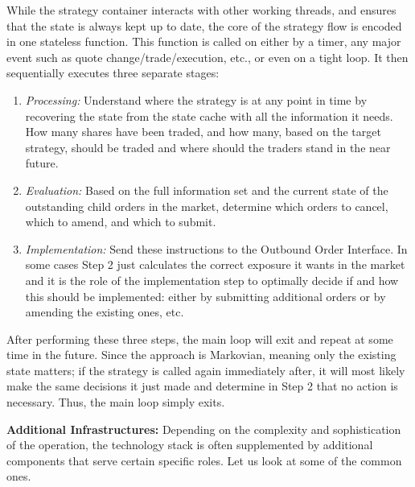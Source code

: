 While the strategy container interacts with other working threads, and ensures that the state is always kept up to date, the core of the strategy flow is encoded in one stateless function. This function is called on either by a timer, any major event such as quote change/trade/execution, etc., or even on a tight loop. It  then sequentially executes three separate stages:
        \begin{enumerate}
        \item\emph{Processing:} Understand where the strategy is at any point in time by recovering the state from the state cache with all the information it needs. How many shares have been traded, and how many, based on the target strategy, should be traded and where should the traders stand in the near future. 
        \item\emph{Evaluation:} Based on the full information set and the current state of the outstanding child orders in the market, determine which orders to cancel, which to amend, and which to submit.
        \item\emph{Implementation:} Send these instructions to the Outbound Order Interface. In some cases Step 2 just calculates the correct exposure it wants in the market and it is the role of the implementation step to optimally decide if and how this should be implemented: either by submitting additional orders or by amending the existing ones, etc.
        \end{enumerate}
After performing these three steps, the main loop will exit and repeat at some time in the future. Since the approach is Markovian, meaning only the existing state matters; if the strategy is called again immediately after, it will most likely make the same decisions it just made and determine in Step 2 that no action is necessary. Thus, the main loop simply exits. \twomedskip


\noindent\textbf{Additional Infrastructures:} Depending on the complexity and sophistication of the operation, the technology stack is often supplemented by additional components that serve certain specific roles. Let us look at some of the common ones. \twomedskip


